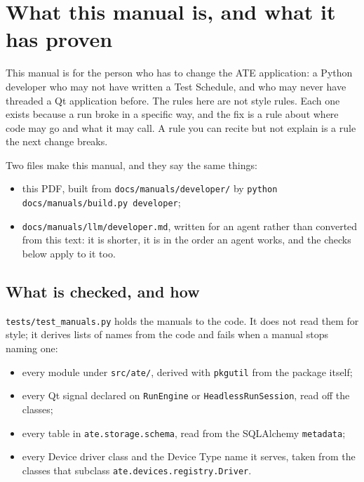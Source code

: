 \chapter{What this manual is, and what it has proven}\label{ch:intro}

This manual is for the person who has to change the ATE application: a Python developer who may not
have written a Test Schedule, and who may never have threaded a Qt application before. The rules here
are not style rules. Each one exists because a run broke in a specific way, and the fix is a rule
about where code may go and what it may call. A rule you can recite but not explain is a rule the next
change breaks.

Two files make this manual, and they say the same things:

\begin{itemize}
  \item this PDF, built from \texttt{docs/\allowbreak{}manuals/\allowbreak{}developer/\allowbreak} by \texttt{python docs/\allowbreak{}manuals/\allowbreak{}build.py developer};
  \item \texttt{docs/\allowbreak{}manuals/\allowbreak{}llm/\allowbreak{}developer.md}, written for an agent rather than converted from this
    text: it is shorter, it is in the order an agent works, and the checks below apply to it too.
\end{itemize}

\section{What is checked, and how}

\texttt{tests/\allowbreak{}test\_\allowbreak{}manuals.py} holds the manuals to the code. It does not read them for style; it
derives lists of names from the code and fails when a manual stops naming one:

\begin{itemize}
  \item every module under \texttt{src/ate/}, derived with \texttt{pkgutil} from the package itself;
  \item every Qt signal declared on \texttt{RunEngine} or \texttt{HeadlessRunSession}, read off the
    classes;
  \item every table in \texttt{ate.storage.schema}, read from the SQLAlchemy \texttt{metadata};
  \item every Device driver class and the Device Type name it serves, taken from the classes that
    subclass \texttt{ate.devices.registry.Driver}.
\end{itemize}

